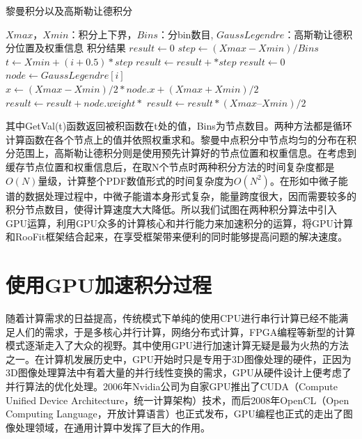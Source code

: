 \begin{algorithm}  
    \caption{黎曼积分以及高斯勒让德积分}  
    \begin{algorithmic}[1] 
        \Require 
            $Xmax$，$Xmin$：积分上下界，$Bins$：分bin数目, $GaussLegendre$：高斯勒让德积分位置及权重信息
        \Ensure 
            积分结果
            \State $result \gets 0$  
            \State $step \gets (Xmax - Xmin) / Bins$
                \State $t \gets Xmin + (i + 0.5) * step$
                \State $result \gets result + $$ * step$
            \EndFor
            \State {}
        \EndFunction
            \State $result \gets 0$  
                \State $node \gets GaussLegendre[i]$
                \State $x \gets (Xmax-Xmin)/ 2 * node.x + (Xmax + Xmin) / 2$
                \State $result \gets result + node.weight * 
                $
            \EndFor
            \State $result \gets result * (Xmax – Xmin) / 2 $
            \State {}
        \EndFunction
    \end{algorithmic}  
    \label{code:1}
\end{algorithm}  

其中GetVal(t)函数返回被积函数在t处的值，Bins为节点数目。两种方法都是循环计算函数在各个节点上的值并依照权重求和。黎曼中点积分中节点均匀的分布在积分范围上，高斯勒让德积分则是使用预先计算好的节点位置和权重信息。在考虑到缓存节点位置和权重信息后，在取N个节点时两种积分方法的时间复杂度都是$O(N)$量级，计算整个PDF数值形式的时间复杂度为$O(N^2)$。在形如中微子能谱的数据处理过程中，中微子能谱本身形式复杂，能量跨度很大，因而需要较多的积分节点数目，使得计算速度大大降低。所以我们试图在两种积分算法中引入GPU运算，利用GPU众多的计算核心和并行能力来加速积分的运算，将GPU计算和RooFit框架结合起来，在享受框架带来便利的同时能够提高问题的解决速度。

\section{使用GPU加速积分过程}
随着计算需求的日益提高，传统模式下单纯的使用CPU进行串行计算已经不能满足人们的需求，于是多核心并行计算，网络分布式计算，FPGA编程等新型的计算模式逐渐走入了大众的视野。其中使用GPU进行加速计算无疑是最为火热的方法之一。在计算机发展历史中，GPU开始时只是专用于3D图像处理的硬件，正因为3D图像处理算法中有着大量的并行线性变换的需求，GPU从硬件设计上便考虑了并行算法的优化处理。2006年Nvidia公司为自家GPU推出了CUDA（Compute Unified Device Architecture，统一计算架构）技术\supercite{CUDA}，而后2008年OpenCL（Open Computing Language，开放计算语言）也正式发布\supercite{opencl}，GPU编程也正式的走出了图像处理领域，在通用计算中发挥了巨大的作用。

